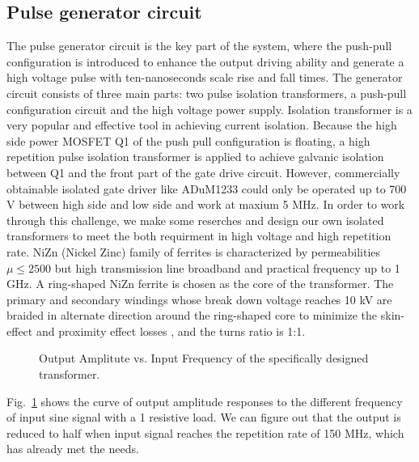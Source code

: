 \documentclass[aip,rsi,reprint,graphicx]{revtex4-1} %
\begin{document}
\subsection{Pulse generator circuit}
The pulse generator circuit is the key part of the system, where the push-pull configuration is introduced to enhance the output driving ability and generate a high voltage pulse with ten-nanoseconds scale rise and fall times. 
The generator circuit consists of three main parts: two pulse isolation transformers, a push-pull configuration circuit and the high voltage power supply.
 Isolation transformer is a very popular and effective tool in achieving current isolation. 
 Because the high side power MOSFET Q1 of the push pull configuration is floating, a high repetition pulse isolation transformer is applied to achieve galvanic isolation between Q1 and the front part of the gate drive circuit. 
 However, commercially obtainable isolated gate driver like ADuM1233 could only be operated up to 700 V between high side and low side and work at maxium 5 MHz. In order to work through this challenge, we make some reserches and design our own isolated transformers to meet the both requirment in high voltage and high repetition rate.
 NiZn (Nickel Zinc) family of ferrites is characterized by permeabilities $\mu\le2500$ but high transmission line broadband and practical frequency up to 1 GHz\cite{TDKNiZn}.
 A ring-shaped NiZn ferrite is chosen as the core of the transformer.
 The primary and secondary windings whose break down voltage reaches 10 kV are braided in alternate direction around the ring-shaped core to minimize the skin-effect and proximity effect losses \cite{Dixon2001power}, and the turns ratio is 1:1.

\begin{figure}[hbt]
{}  
  \caption{Output Amplitute vs. Input Frequency of the specifically designed transformer.\label{FIG8}}
\end{figure}

 Fig.~\ref{FIG8} shows the curve of output amplitude responses to the different frequency of input sine signal with a 1 resistive load.
 We can figure out that the output is reduced to half when input signal reaches the repetition rate of 150 MHz, which has already met the needs.

\end{document}
